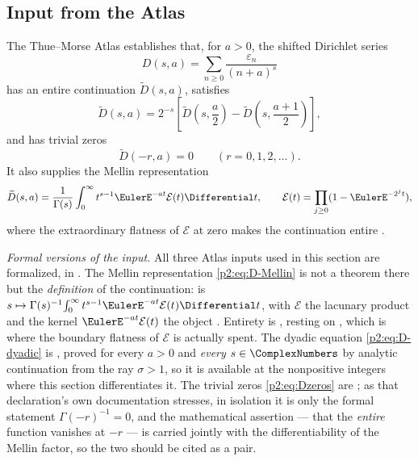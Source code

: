 \documentclass[11pt,oneside]{article}
\numberwithin{equation}{section}
\theoremstyle{definition}
\theoremstyle{remark}
\newcommand{\eps}{\varepsilon}
\begin{document}
\subsection{Input from the Atlas}

The Thue--Morse Atlas establishes that, for $a>0$, the shifted Dirichlet series
\begin{equation}
 D(s,a)=\sum_{n\ge0}\frac{\eps_n}{(n+a)^s}
 \label{p2:eq:Dsa}
\end{equation}
has an entire continuation $\widetilde D(s,a)$, satisfies
\begin{equation}
 \widetilde D(s,a)=2^{-s}\left[
 \widetilde D\!\left(s,\frac a2\right)
 -\widetilde D\!\left(s,\frac{a+1}{2}\right)\right],
 \label{p2:eq:D-dyadic}
\end{equation}
and has trivial zeros
\begin{equation}
 \widetilde D(-r,a)=0\qquad(r=0,1,2,\ldots).
 \label{p2:eq:Dzeros}
\end{equation}
It also supplies the Mellin representation
\begin{equation}
 \widetilde D(s,a)=\frac1{\Gamma(s)}
 \int_0^\infty t^{s-1}\EulerE^{-at}\mathcal E(t)\Differential t,
 \qquad
 \mathcal E(t)=\prod_{j\ge0}(1-\EulerE^{-2^jt}),
 \label{p2:eq:D-Mellin}
\end{equation}
where the extraordinary flatness of $\mathcal E$ at zero makes the continuation entire
\cite{p2:proveit-atlas,p2:toth2022}.

\emph{Formal versions of the input.}  All three Atlas inputs used in this section are
formalized, in .  The Mellin representation
\eqref{p2:eq:D-Mellin} is not a theorem there but the \emph{definition} of the continuation:
 is $s\mapsto\Gamma(s)^{-1}\!\int_0^\infty
t^{s-1}\EulerE^{-at}\mathcal E(t)\Differential t$, with $\mathcal E$ the lacunary product
 and the kernel $\EulerE^{-at}\mathcal E(t)$ the object
.  Entirety is
, resting on
, which is where the boundary flatness of
$\mathcal E$ is actually spent.  The dyadic equation \eqref{p2:eq:D-dyadic} is
, proved for every $a>0$ and \emph{every}
$s\in\ComplexNumbers$ by analytic continuation from the ray $\sigma>1$, so it is available at the
nonpositive integers where this section differentiates it.  The trivial zeros
\eqref{p2:eq:Dzeros} are ; as that
declaration's own documentation stresses, in isolation it is only the formal statement
$\Gamma(-r)^{-1}=0$, and the mathematical assertion --- that the \emph{entire} function
vanishes at $-r$ --- is carried jointly with the differentiability of the Mellin factor, so
the two should be cited as a pair.
\end{document}
